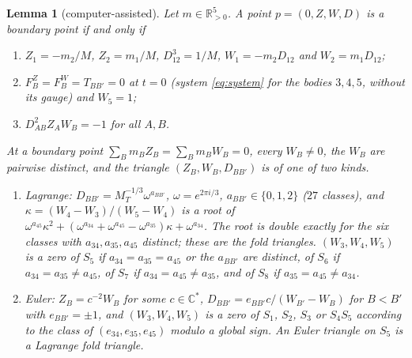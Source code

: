 \documentclass[Threeside,11pt]{article}
\newtheorem{lemma}[theorem]{Lemma}
\theoremstyle{definition}
\theoremstyle{remark}
\numberwithin{equation}{section}
\newcommand{\C}{\mathbb C}\newcommand{\T}{\mathbb T}
\theoremstyle{remark}
\newcommand{\Rp}{\mathbb{R}_{>0}}
\newenvironment{romanlist}{\begin{enumerate}\renewcommand{\labelenumi}{(\roman{enumi})}%
  \renewcommand{\theenumi}{\roman{enumi}}}{\end{enumerate}}
\newenvironment{alphalist}{\begin{enumerate}\renewcommand{\labelenumi}{(\alph{enumi})}%
  \renewcommand{\theenumi}{\alph{enumi}}}{\end{enumerate}}
\begin{document}
\begin{lemma}[computer-assisted]\label{lem:d2-fibre}
Let $m\in\Rp^5$.  A point $p=(0,Z,W,D)$ is a boundary point if and only if
\begin{alphalist}
  \item $Z_1=-m_2/M$, $Z_2=m_1/M$, $D_{12}^3=1/M$, $W_1=-m_2D_{12}$ and $W_2=m_1D_{12}$;
  \item $F^Z_B=F^W_B=T_{BB'}=0$ at $t=0$ (system \eqref{eq:system} for the bodies $3,4,5$,
  without its gauge) and $W_5=1$;
  \item $D_{AB}^2Z_AW_B=-1$ for all $A,B$.
\end{alphalist}
At a boundary point $\sum_Bm_BZ_B=\sum_Bm_BW_B=0$, every $W_B\ne0$, the $W_B$ are pairwise distinct, and
the \emph{triangle} $(Z_B,W_B,D_{BB'})$ is of one of two kinds.
\begin{romanlist}
  \item \emph{Lagrange:} $D_{BB'}=M_T^{-1/3}\omega^{a_{BB'}}$, $\omega=e^{2\pi i/3}$,
  $a_{BB'}\in\{0,1,2\}$ ($27$ classes), and $\kappa=(W_4-W_3)/(W_5-W_4)$ is a root of
  $\omega^{a_{45}}\kappa^2+(\omega^{a_{34}}+\omega^{a_{45}}-\omega^{a_{35}})\kappa+\omega^{a_{34}}$.
  The root is double exactly for the six classes with $a_{34},a_{35},a_{45}$ distinct; these are
  the \emph{fold} triangles.  $(W_3,W_4,W_5)$ is a zero of $S_5$ if $a_{34}=a_{35}=a_{45}$ or the
  $a_{BB'}$ are distinct, of $S_6$ if $a_{34}=a_{35}\ne a_{45}$, of $S_7$ if
  $a_{34}=a_{45}\ne a_{35}$, and of $S_8$ if $a_{35}=a_{45}\ne a_{34}$.
  \item \emph{Euler:} $Z_B=c^{-2}W_B$ for some $c\in\C^*$, $D_{BB'}=e_{BB'}c/(W_{B'}-W_B)$ for
  $B<B'$ with $e_{BB'}=\pm1$, and $(W_3,W_4,W_5)$ is a zero of $S_1$, $S_2$, $S_3$ or $S_4S_5$
  according to the class of $(e_{34},e_{35},e_{45})$ modulo a global sign.  An Euler triangle on
  $S_5$ is a Lagrange fold triangle.
\end{romanlist}
\end{lemma}
\end{document}
